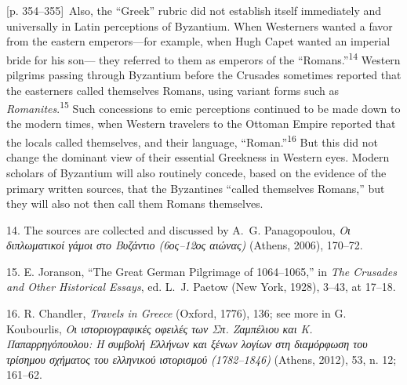 \documentclass[10pt,a4paper]{article}
\begin{document}
{\scriptsize\color{gray}[p. 354–355]}\ Also, the “Greek” rubric did not establish itself immediately and universally in Latin perceptions of Byzantium. When Westerners wanted a favor from the eastern emperors—for example, when Hugh Capet wanted an imperial bride for his son— they referred to them as emperors of the “Romans.”\nobreak\textsuperscript{14} Western pilgrims passing through Byzantium before the Crusades sometimes reported that the easterners called themselves Romans, using variant forms such as \textit{Romanites}.\nobreak\textsuperscript{15} Such concessions to emic perceptions continued to be made down to the modern times, when Western travelers to the Ottoman Empire reported that the locals called themselves, and their language, “Roman.”\nobreak\textsuperscript{16} But this did not change the dominant view of their essential Greekness in Western eyes. Modern scholars of Byzantium will also routinely concede, based on the evidence of the primary written sources, that the Byzantines “called themselves Romans,” but they will also not then call them Romans themselves.\par{\small 14. The sources are collected and discussed by A. G. Panagopoulou, \textit{Οι διπλωματικοί γάμοι στο Βυζάντιο (6ος–12ος αιώνας)} (Athens, 2006), 170–72.\par}{\small 15.  E. Joranson, “The Great German Pilgrimage of 1064–1065,” in \textit{The Crusades and Other Historical Essays}, ed. L. J. Paetow (New York, 1928), 3–43, at 17–18.\par}{\small 16. R. Chandler, \textit{Travels in Greece} (Oxford, 1776), 136; see more in G. Koubourlis, \textit{Οι ιστοριογραφικές οφειλές των Σπ. Ζαμπέλιου και Κ. Παπαρρηγόπουλου: Η συμβολή Ελλήνων και ξένων λογίων στη διαμόρφωση του τρίσημου σχήματος του ελληνικού ιστορισμού (1782–1846)} (Athens, 2012), 53, n. 12; 161–62.\par}
\end{document}

